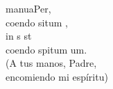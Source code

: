 \begin{cancion}%
	 manuaPer,\\
	coendo situm ,\\
	in s st \\
	coendo spitum um.\\
(A tus manos, Padre, \\
 encomiendo mi espíritu)\\
\end{cancion}%
